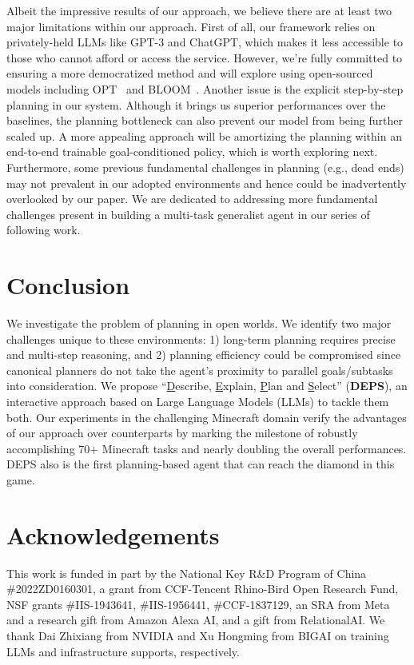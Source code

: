 \documentclass{article}
\begin{document}
Albeit the impressive results of our approach, we believe there are at least two major limitations within our approach. First of all, our framework relies on privately-held LLMs like GPT-3 and ChatGPT, which makes it less accessible to those who cannot afford or access the service. However, we're fully committed to ensuring a more democratized method and will explore using open-sourced models including OPT~\cite{zhang2022opt} and BLOOM~\cite{scao2022bloom}. Another issue is the explicit step-by-step planning in our system. Although it brings us superior performances over the baselines, the planning bottleneck can also prevent our model from being further scaled up. A more appealing approach will be amortizing the planning within an end-to-end trainable goal-conditioned policy, which is worth exploring next.  Furthermore, some previous fundamental challenges in planning (e.g., dead ends) may not prevalent in our adopted environments and hence could be inadvertently overlooked by our paper. We are dedicated to addressing more fundamental challenges present in building a multi-task generalist agent in our series of following work.



\section{Conclusion}

We investigate the problem of planning in open worlds. We identify two major challenges unique to these environments: 1) long-term planning requires precise and multi-step reasoning, and 2) planning efficiency could be compromised since canonical planners do not take the agent's proximity to parallel goals/subtasks into consideration. We propose ``\underline{D}escribe, \underline{E}xplain, \underline{P}lan and \underline{S}elect'' (\textbf{DEPS}), an interactive approach based on Large Language Models (LLMs) to tackle them both. Our experiments in the challenging Minecraft domain verify the advantages of our approach over counterparts by marking the milestone of robustly accomplishing 70+ Minecraft tasks and nearly doubling the overall performances. DEPS also is the first planning-based agent that can reach the diamond in this game. 

\newpage

\section*{Acknowledgements}
This work is funded in part by the National Key R\&D Program of China \#2022ZD0160301, a grant from  CCF-Tencent Rhino-Bird Open Research Fund, NSF grants \#IIS-1943641, \#IIS-1956441, \#CCF-1837129, an SRA from Meta and a research
gift from Amazon Alexa AI, and a gift from RelationalAI. We thank Dai Zhixiang from NVIDIA and Xu Hongming from BIGAI on training LLMs and infrastructure supports, respectively.
\end{document}
